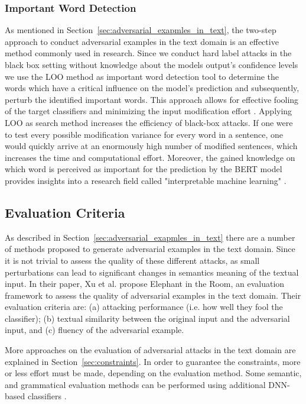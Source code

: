 \subsubsection{Important Word Detection}
\label{sec:iwd_method}
As mentioned in Section~\ref{sec:adversarial_exapmles_in_text}, the two-step approach to conduct adversarial examples in the text domain is an effective method commonly used in research. Since we conduct hard label attacks in the black box setting without knowledge about the models output's confidence levels we use the LOO method as important word detection tool to determine the words which have a critical influence on the model's prediction and subsequently, perturb the identified important words. This approach allows for effective fooling of the target classifiers and minimizing the input modification effort \cite{jin2019bert}. Applying LOO as search method increases the efficiency of black-box attacks. If one were to test every possible modification variance for every word in a sentence, one would quickly arrive at an enormously high number of modified sentences, which increases the time and computational effort. Moreover, the gained knowledge on which word is perceived as important for the prediction by the BERT model provides insights into a research field called "interpretable machine learning" \cite{doshi2017towards}.




\subsection{Evaluation Criteria}
    \label{sec:evaluation_tb}
As described in Section~\ref{sec:adversarial_exapmles_in_text} there are a number of methods proposed to generate adversarial examples in the text domain. Since it is not trivial to assess the quality of these different attacks, as small perturbations can lead to significant changes in semantics meaning of the textual input. In their paper, Xu et al. propose Elephant in the Room, an evaluation framework to assess the quality of adversarial examples in the text domain\cite{xu2020elephant}. Their evaluation criteria are:
(a) attacking performance (i.e. how well they fool the classifier); 
(b) textual similarity between the original input and the adversarial input, and
(c) fluency of the adversarial example.

More approaches on the evaluation of adversarial attacks in the text domain are explained in Section~\ref{sec:constraints}. In order to guarantee the constraints, more or less effort must be made, depending on the evaluation method. Some semantic, and grammatical evaluation methods can be performed using additional DNN-based classifiers \cite{ebrahimi2017hotflip, jin2019bert, garg2020bae}.

